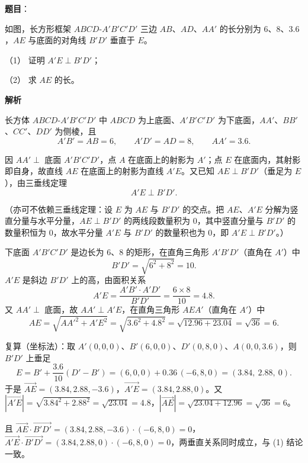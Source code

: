 \begin{answer}

\textbf{题目}：

如图，长方形框架 $ABCD\text{-}A'B'C'D'$ 三边 $AB$、$AD$、$AA'$ 的长分别为 $6$、$8$、$3.6$，$AE$ 与底面的对角线 $B'D'$ 垂直于 $E$。

（1） 证明 $A'E\perp B'D'$；

（2） 求 $AE$ 的长。
\nopagebreak[4]
\begin{center}\end{center}
\nopagebreak[4]
\textbf{解析}
\nopagebreak[4]
\begin{center}\end{center}
\nopagebreak[4]
长方体 $ABCD\text{-}A'B'C'D'$ 中 $ABCD$ 为上底面、$A'B'C'D'$ 为下底面，$AA'$、$BB'$、$CC'$、$DD'$ 为侧棱，且
\nopagebreak[4]
\[
A'B'=AB=6,\qquad A'D'=AD=8,\qquad AA'=3.6.
\]


因 $AA'\perp$ 底面 $A'B'C'D'$，点 $A$ 在底面上的射影为 $A'$；点 $E$ 在底面内，其射影即自身，故直线 $AE$ 在底面上的射影为直线 $A'E$。又已知 $AE\perp B'D'$（垂足为 $E$），由三垂线定理
\nopagebreak[4]
\[
A'E\perp B'D'.
\]

（亦可不依赖三垂线定理：设 $E$ 为 $AE$ 与 $B'D'$ 的交点。把 $AE$、$A'E$ 分解为竖直分量与水平分量，$AE\perp B'D'$ 的两线段数量积为 $0$，其中竖直分量与 $B'D'$ 的数量积恒为 $0$，故水平分量 $A'E$ 与 $B'D'$ 的数量积也为 $0$，即 $A'E\perp B'D'$。）


下底面 $A'B'C'D'$ 是边长为 $6$、$8$ 的矩形，在直角三角形 $A'B'D'$（直角在 $A'$）中
\nopagebreak[4]
\[
B'D'=\sqrt{6^2+8^2}=10.
\]
$A'E$ 是斜边 $B'D'$ 上的高，由面积关系
\nopagebreak[4]
\[
A'E=\frac{A'B'\cdot A'D'}{B'D'}=\frac{6\times8}{10}=4.8.
\]
又 $AA'\perp$ 底面，故 $AA'\perp A'E$，在直角三角形 $AEA'$（直角在 $A'$）中
\nopagebreak[4]
\[
AE=\sqrt{AA'^2+A'E^2}=\sqrt{3.6^2+4.8^2}=\sqrt{12.96+23.04}=\sqrt{36}=6.
\]

复算（坐标法）：取 $A'(0,0,0)$、$B'(6,0,0)$、$D'(0,8,0)$、$A(0,0,3.6)$，则 $B'D'$ 上垂足
\nopagebreak[4]
\[
E=B'+\frac{3.6}{10}(D'-B')=(6,0,0)+0.36\,(-6,8,0)=(3.84,\ 2.88,\ 0).
\]
于是 $\overrightarrow{AE}=(3.84,2.88,-3.6)$，$\overrightarrow{A'E}=(3.84,2.88,0)$。又 $|\overrightarrow{A'E}|=\sqrt{3.84^2+2.88^2}=\sqrt{23.04}=4.8$，$|\overrightarrow{AE}|=\sqrt{23.04+12.96}=\sqrt{36}=6$。

且 $\overrightarrow{AE}\cdot\overrightarrow{B'D'}=(3.84,2.88,-3.6)\cdot(-6,8,0)=0$，$\overrightarrow{A'E}\cdot\overrightarrow{B'D'}=(3.84,2.88,0)\cdot(-6,8,0)=0$，两垂直关系同时成立，与 (1) 结论一致。



\end{answer}
